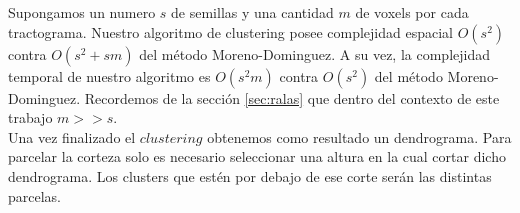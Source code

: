 Supongamos un numero $s$ de semillas y una cantidad $m$ de voxels por cada
tractograma. Nuestro algoritmo de clustering posee complejidad espacial 
$O(s^2)$ contra $O(s^2 + sm)$ del m\'etodo Moreno-Dominguez. A su vez, la
complejidad temporal de nuestro algoritmo es $O(s^2m)$ contra $O(s^2)$ del
m\'etodo Moreno-Dominguez. Recordemos de la secci\'on \ref{sec:ralas} que
dentro del contexto de este trabajo $m >> s$. \\

Una vez finalizado el $clustering$ obtenemos como resultado un 
dendrograma. Para parcelar la corteza solo es necesario seleccionar una
altura en la cual cortar dicho dendrograma. Los clusters que est\'en por
debajo de ese corte ser\'an las distintas parcelas.

